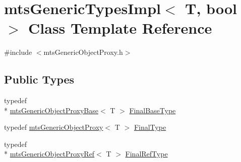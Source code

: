 \hypertarget{classmts_generic_types_impl}{\section{mts\-Generic\-Types\-Impl$<$ T, bool $>$ Class Template Reference}
\label{classmts_generic_types_impl}
}


{\ttfamily \#include $<$mts\-Generic\-Object\-Proxy.\-h$>$}

\subsection*{Public Types}
\begin{DoxyCompactItemize}
\item 
typedef \\*
\hyperlink{classmts_generic_object_proxy_base}{mts\-Generic\-Object\-Proxy\-Base}$<$ T $>$ \hyperlink{classmts_generic_types_impl_a7997b5c3162967dd9f29b33ef5f1858a}{Final\-Base\-Type}
\item 
typedef \hyperlink{classmts_generic_object_proxy}{mts\-Generic\-Object\-Proxy}$<$ T $>$ \hyperlink{classmts_generic_types_impl_ad04e0f563e98adbcac5647ea821f4100}{Final\-Type}
\item 
typedef \\*
\hyperlink{classmts_generic_object_proxy_ref}{mts\-Generic\-Object\-Proxy\-Ref}$<$ T $>$ \hyperlink{classmts_generic_types_impl_a9f668541e03e4b56b77f94fa09ffbe96}{Final\-Ref\-Type}
\end{DoxyCompactItemize}
